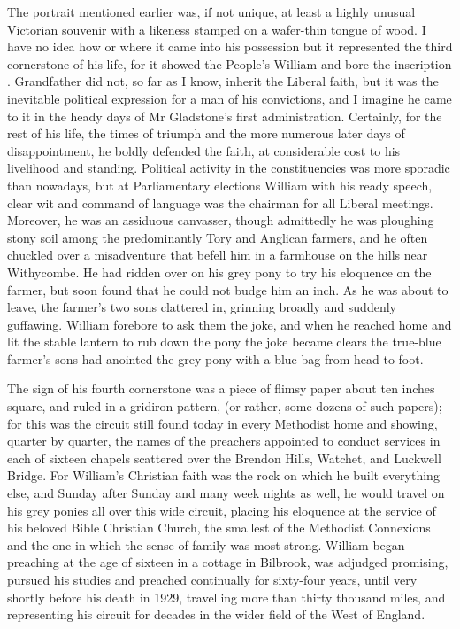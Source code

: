 The portrait mentioned earlier was, if not unique, at least a highly unusual Victorian souvenir with a likeness stamped on a wafer-thin tongue of wood. I have no idea how or where it came into his possession but it represented the third cornerstone of his life, for it showed the People's William and bore the inscription . Grandfather did not, so far as I know, inherit the Liberal faith, but it was the inevitable political expression for a man of his convictions, and I imagine he came to it in the heady days of Mr Gladstone's first administration. Certainly, for the rest of his life, the times of triumph and the more numerous later days of disappointment, he boldly defended the faith, at considerable cost to his livelihood and standing. Political activity in the constituencies was more sporadic than nowadays, but at Parliamentary elections William with his ready speech, clear wit and command of language was the chairman for all Liberal meetings. Moreover, he was an assiduous canvasser, though admittedly he was ploughing stony soil among the predominantly Tory and Anglican farmers, and he often chuckled over a misadventure that befell him in a farmhouse on the hills near Withycombe. He had ridden over on his grey pony to try his eloquence on the farmer, but soon found that he could not budge him an inch. As he was about to leave, the farmer's two sons clattered in, grinning broadly and suddenly guffawing. William forebore to ask them the joke, and when he reached home and lit the stable lantern to rub down the pony the joke became clears the true-blue farmer's sons had anointed the grey pony with a blue-bag from head to foot.

The sign of his fourth cornerstone was a piece of flimsy paper about ten inches square, and ruled in a gridiron pattern, (or rather, some dozens of such papers); for this was the circuit  still found today in every Methodist home and showing, quarter by quarter, the names of the preachers appointed to conduct services in each of sixteen chapels scattered over the Brendon Hills, Watchet, and Luckwell Bridge. For William's Christian faith was the rock on which he built everything else, and Sunday after Sunday and many week nights as well, he would travel on his grey ponies all over this wide circuit, placing his eloquence at the service of his beloved Bible Christian Church, the smallest of the Methodist Connexions and the one in which the sense of family was most strong. William began preaching at the age of sixteen in a cottage in Bilbrook, was adjudged promising, pursued his studies and preached continually for sixty-four years, until very shortly before his death in 1929, travelling more than thirty thousand miles, and representing his circuit for decades in the wider field of the West of England.

